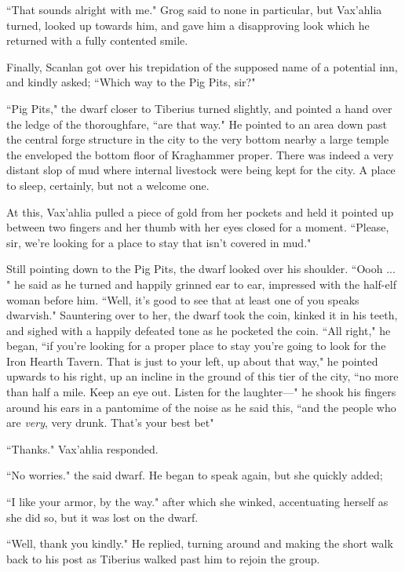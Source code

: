 ``That sounds alright with me." Grog said to none in particular, but Vax'ahlia turned, looked up towards him, and gave him a disapproving look which he returned with a fully contented smile.

Finally, Scanlan got over his trepidation of the supposed name of a potential inn, and kindly asked; ``Which way to the Pig Pits, sir?"

``Pig Pits," the dwarf closer to Tiberius turned slightly, and pointed a hand over the ledge of the thoroughfare, ``are that way." He pointed to an area down past the central forge structure in the city to the very bottom nearby a large temple the enveloped the bottom floor of Kraghammer proper. There was indeed a very distant slop of mud where internal livestock were being kept for the city. A place to sleep, certainly, but not a welcome one.

At this, Vax'ahlia pulled a piece of gold from her pockets and held it pointed up between two fingers and her thumb with her eyes closed for a moment. ``Please, sir, we're looking for a place to stay that isn't covered in mud."

Still pointing down to the Pig Pits, the dwarf looked over his shoulder. ``Oooh ... " he said as he turned and happily grinned ear to ear, impressed with the half-elf woman before him. ``Well, it's good to see that at least one of you speaks dwarvish." Sauntering over to her, the dwarf took the coin, kinked it in his teeth, and sighed with a happily defeated tone as he pocketed the coin. ``All right," he began, ``if you're looking for a proper place to stay you're going to look for the Iron Hearth Tavern. That is just to your left, up about that way," he pointed upwards to his right, up an incline in the ground of this tier of the city, ``no more than half a mile. Keep an eye out. Listen for the laughter---" he shook his fingers around his ears in a pantomime of the noise as he said this, ``and the people who are \textit{very}, very drunk. That's your best bet"

``Thanks." Vax'ahlia responded.

``No worries." the said dwarf. He began to speak again, but she quickly added;

``I like your armor, by the way." after which she winked, accentuating herself as she did so, but it was lost on the dwarf.

``Well, thank you kindly." He replied, turning around and making the short walk back to his post as Tiberius walked past him to rejoin the group.

